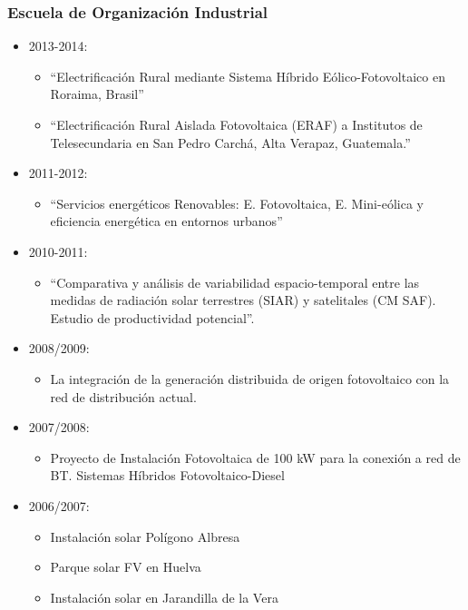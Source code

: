 \documentclass[article, a4paper]{memoir}
\begin{document}
\subsubsection{Escuela de Organización Industrial}
\label{sec:org904985f}
\begin{itemize}
\item 2013-2014:
\begin{itemize}
\item ``Electrificación Rural mediante Sistema Híbrido Eólico-Fotovoltaico en Roraima, Brasil''
\item ``Electrificación Rural Aislada Fotovoltaica (ERAF) a Institutos de Telesecundaria en San Pedro Carchá, Alta Verapaz, Guatemala.''
\end{itemize}
\item 2011-2012:
\begin{itemize}
\item ``Servicios energéticos Renovables: E. Fotovoltaica, E. Mini-eólica y eficiencia energética en entornos urbanos''
\end{itemize}
\item 2010-2011:
\begin{itemize}
\item ``Comparativa y análisis de variabilidad espacio-temporal entre las medidas de radiación solar terrestres (SIAR) y satelitales (CM SAF). Estudio de productividad potencial''.
\end{itemize}
\item 2008/2009:
\begin{itemize}
\item \guillemotleft{}La integración de la generación distribuida de origen fotovoltaico con la red de distribución actual.
\end{itemize}
\item 2007/2008:
\begin{itemize}
\item \guillemotleft{}Proyecto de Instalación Fotovoltaica de 100 kW para la conexión a red de BT. Sistemas Híbridos Fotovoltaico-Diesel\guillemotright{}
\end{itemize}
\item 2006/2007:
\begin{itemize}
\item \guillemotleft{}Instalación solar Polígono Albresa\guillemotright{}
\item \guillemotleft{}Parque solar FV en Huelva\guillemotright{}
\item \guillemotleft{}Instalación solar en Jarandilla de la Vera\guillemotright{}

\end{itemize}
\end{itemize}
\end{document}
